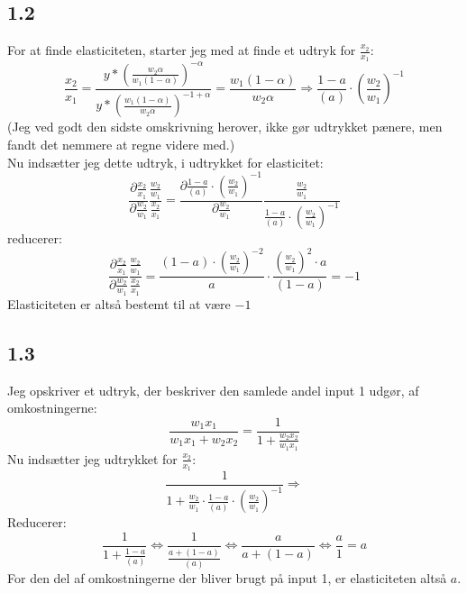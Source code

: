 \documentclass{article}
\begin{document}
\subsection*{1.2}
For at finde elasticiteten, starter jeg med at finde et udtryk for $\frac{x_2}{x_1}$:
\begin{equation}
    \frac{x_2}{x_1} = \frac{y *\left(\frac{w_2 \alpha}{w_1(1-\alpha)}\right)^{-\alpha}}{y *\left(\frac{w_1(1-\alpha)}{w_2 \alpha}\right)^{-1+\alpha}} =\frac{w_1(1-\alpha)}{w_2 \alpha} \Rightarrow \frac{1-a}{(a)} \cdot\left(\frac{w_2}{w_1}\right)^{-1}
\end{equation}
(Jeg ved godt den sidste omskrivning herover, ikke gør udtrykket pænere, men fandt det nemmere at regne videre med.) 
\\Nu indsætter jeg dette udtryk, i udtrykket for elasticitet:
\begin{equation}
    \frac{\partial \frac{x_2}{x_1}}{\partial \frac{w_2}{w_1}} \frac{\frac{w_2}{w_1}}{\frac{x_2}{x_1}}=\frac{\partial \frac{1-a}{(a)} \cdot\left(\frac{w_2}{w_1}\right)^{-1}}{\partial \frac{w_2}{w_1}} \frac{\frac{w_2}{w_1}}{\frac{1-a}{(a)} \cdot\left(\frac{w_2}{w_1}\right)^{-1}}
\end{equation}
reducerer:
\begin{equation}
    \frac{\partial \frac{x_2}{x_1}}{\partial \frac{w_2}{w_1}} \frac{\frac{w_2}{w_1}}{\frac{x_2}{x_1}}=\frac{(1-a) \cdot\left(\frac{w_2}{w_1}\right)^{-2}}{a} \cdot \frac{\left(\frac{w_2}{w_1}\right)^2 \cdot a}{(1-a)} = -1
\end{equation}
Elasticiteten er altså bestemt til at være $-1$

\subsection*{1.3}
Jeg opskriver et udtryk, der beskriver den samlede andel input 1 udgør, af omkostningerne:
\begin{equation}
    \frac{w_1 x_1}{w_1 x_1+w_2 x_2}=\frac{1}{1+\frac{w_2 x_2}{w_1 x_1}}
\end{equation}
Nu indsætter jeg udtrykket for $\frac{x_2}{x_1}$:
\begin{equation}
    \frac{1}{1+\frac{w_2}{w_1} \cdot \frac{1-a}{(a)} \cdot\left(\frac{w_2}{w_1}\right)^{-1}} \Rightarrow
\end{equation}
Reducerer:
\begin{equation}
    \frac{1}{1+\frac{1-a}{(a)}}\Leftrightarrow\frac{1}{\frac{a+(1-a)}{(a)}}\Leftrightarrow\frac{a}{a+(1-a)}\Leftrightarrow\frac{a}{1}=a
\end{equation}
For den del af omkostningerne der bliver brugt på input 1, er elasticiteten altså $a$.
\end{document}
